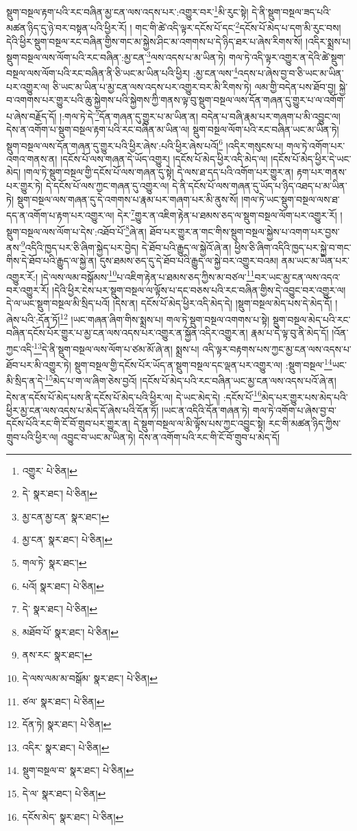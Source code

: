 སྡུག་བསྔལ་རྟག་པའི་རང་བཞིན་མྱ་ངན་ལས་འདས་པར་:འགྱུར་བར་\footnote{འགྱུར་  པེ་ཅིན། }མི་རུང་སྟེ། དེ་ནི་སྡུག་བསྔལ་ཟད་པའི་མཚན་ཉིད་དུ་ཉེ་བར་བསྟན་པའི་ཕྱིར་རོ། །
གང་གི་ཚེ་འདི་ལྟར་དངོས་པོ་དང་\footnote{དེ་  སྣར་ཐང་།  པེ་ཅིན། }དངོས་པོ་མེད་པ་དག་མི་རུང་བས། དེའི་ཕྱིར་སྡུག་བསྔལ་རང་བཞིན་གྱིས་གང་མ་སྐྱེས་ཤིང་མ་འགགས་པ་དེ་ཉིད་ཐར་པ་ཞེས་རིགས་སོ། །འདིར་སྨྲས་པ། སྡུག་བསྔལ་ལས་ལོག་པའི་རང་བཞིན་:མྱ་ངན་\footnote{མྱ་ངན་མྱ་ངན་  སྣར་ཐང་། }ལས་འདས་པ་མ་ཡིན་ཏེ། གལ་ཏེ་འདི་ལྟར་འགྱུར་ན་དེའི་ཚེ་སྡུག་བསྔལ་ལས་ལོག་པའི་རང་བཞིན་ནི་ཅི་ཡང་མ་ཡིན་པའི་ཕྱིར། :མྱ་ངན་ལས་\footnote{མྱ་ངན་  སྣར་ཐང་།  པེ་ཅིན། }འདས་པ་ཞེས་བྱ་བ་ཅི་ཡང་མ་ཡིན་པར་འགྱུར་ལ། ཅི་ཡང་མ་ཡིན་པ་མྱ་ངན་ལས་འདས་པར་འགྱུར་བར་མི་རིགས་ཏེ། ལམ་གྱི་བདེན་པས་ཐོབ་བྱ། སྐྱེ་བ་འགགས་པར་གྱུར་པའི་ཆུ་སྐྱེགས་པའི་སྐྱེགས་ཀྱི་གནས་ལྟ་བུ་སྡུག་བསྔལ་ལས་དོན་གཞན་དུ་གྱུར་པ་ལ་འགོག་པ་ཞེས་བརྗོད་དོ། །:གལ་ཏེ་དེ་\footnote{གལ་ཏེ་  སྣར་ཐང་། }དོན་གཞན་དུ་གྱུར་པ་མ་ཡིན་ན། བདེན་པ་བཞི་རྣམ་པར་གཞག་པ་མི་འབྱུང་ལ། དེས་ན་འགོག་པ་སྡུག་བསྔལ་རྟག་པའི་རང་བཞིན་མ་ཡིན་ལ། སྡུག་བསྔལ་ལོག་པའི་རང་བཞིན་ཡང་མ་ཡིན་ཏེ། སྡུག་བསྔལ་ལས་དོན་གཞན་དུ་གྱུར་པའི་ཕྱིར་ཞེས་:པའི་ཕྱིར་ཞེས་པའོ།\footnote{པའོ།  སྣར་ཐང་།  པེ་ཅིན། } །འདིར་གསུངས་པ། གལ་ཏེ་འགོག་པར་འགའ་གནས་ན། །དངོས་པོ་ལས་གཞན་དེ་ཡོད་འགྱུར། །དངོས་པོ་མེད་ཕྱིར་འདི་མེད་ལ། །དངོས་པོ་མེད་ཕྱིར་དེ་ཡང་མེད། །གལ་ཏེ་སྡུག་བསྔལ་གྱི་དངོས་པོ་ལས་གཞན་དུ་སྟེ། དེ་ལས་ཐ་དད་པའི་འགོག་པར་གྱུར་ན། རྟག་པར་གནས་པར་གྱུར་ཏེ། དེ་དངོས་པོ་ལས་ཀྱང་གཞན་དུ་འགྱུར་ལ། དེ་ནི་དངོས་པོ་ལས་གཞན་དུ་ཡོད་པ་ཉིད་འཐད་པ་མ་ཡིན་ཏེ། སྡུག་བསྔལ་ལས་གཞན་དུ་དེ་འགགས་པ་རྣམ་པར་གཞག་པར་མི་ནུས་སོ། །གལ་ཏེ་ཡང་སྡུག་བསྔལ་ལས་ཐ་དད་ན་འགོག་པ་རྟག་པར་འགྱུར་ལ། དེར་\footnote{དེ་  སྣར་ཐང་།  པེ་ཅིན། }གྱུར་ན་འཇིག་རྟེན་པ་ཐམས་ཅད་ལ་སྡུག་བསྔལ་ལོག་པར་འགྱུར་རོ། །སྡུག་བསྔལ་ལས་ལོག་པ་དེས་:འཐོབ་པོ་\footnote{མཐོབ་པོ་  སྣར་ཐང་།  པེ་ཅིན། }ཞེ་ན། ཐོབ་པར་གྱུར་ན་གང་གིས་སྡུག་བསྔལ་སྐྱེས་པ་འགག་པར་བྱས་ནས་\footnote{ནས་རང་  སྣར་ཐང་། }འདིའི་ཁྱད་པར་ཅི་ཞིག་སྐྱེད་པར་བྱེད། དེ་ཐོབ་པའི་རྒྱུད་ལ་སྐྱེའོ་ཞེ་ན། ཕྱིས་ཅི་ཞིག་འདིའི་ཁྱད་པར་སྐྱེ་བ་གང་གིས་དེ་ཐོབ་པའི་རྒྱུད་ལ་སྐྱེ་ན། དུས་ཐམས་ཅད་དུ་དེ་ཐོབ་པའི་རྒྱུད་ལ་སྐྱེ་བར་འགྱུར་བའམ། ནམ་ཡང་མ་ཡིན་པར་འགྱུར་རོ:། །དེ་ལས་ལམ་བསྒོམས་\footnote{དེ་ལས་ལམ་མ་བསྒོམ་  སྣར་ཐང་།  པེ་ཅིན། }པ་འཇིག་རྟེན་པ་ཐམས་ཅད་ཀྱིས་མ་བཙལ་\footnote{ཙལ་  སྣར་ཐང་།  པེ་ཅིན། }བར་ཡང་མྱ་ངན་ལས་འདའ་བར་འགྱུར་རོ། །དེའི་ཕྱིར་ངེས་པར་སྡུག་བསྔལ་ལ་ལྟོས་པ་དང་བཅས་པའི་རང་བཞིན་གྱིས་དེ་འབྱུང་བར་འགྱུར་ལ། དེ་ལ་ཡང་སྡུག་བསྔལ་མི་སྲིད་པའོ། །དེས་ན། དངོས་པོ་མེད་ཕྱིར་འདི་མེད་དེ། །སྡུག་བསྔལ་མེད་པས་དེ་མེད་དོ། །ཞེས་པའི་:དོན་ཏོ།\footnote{དོན་ཏེ།  སྣར་ཐང་།  པེ་ཅིན། } །ཡང་གཞན་ཞིག་གིས་སྨྲས་པ། གལ་ཏེ་སྡུག་བསྔལ་འགགས་པ་སྟེ། སྡུག་བསྔལ་མེད་པའི་རང་བཞིན་དངོས་པོར་གྱུར་པ་མྱ་ངན་ལས་འདས་པར་འགྱུར་ན་སྐྱོན་འདིར་འགྱུར་ན། རྣམ་པ་དེ་ལྟ་བུ་ནི་མེད་དོ། །འོན་ཀྱང་འདི་\footnote{འདིར་  སྣར་ཐང་།  པེ་ཅིན། }དེ་ནི་སྡུག་བསྔལ་ལས་ལོག་པ་ཙམ་མོ་ཞེ་ན། སྨྲས་པ། འདི་ལྟར་བརྟགས་པས་ཀྱང་མྱ་ངན་ལས་འདས་པ་ཐོབ་པར་མི་འགྱུར་ཏེ། སྡུག་བསྔལ་གྱི་དངོས་པོར་ཡོད་ན་སྡུག་བསྔལ་དང་ལྡན་པར་འགྱུར་ལ། :སྡུག་བསྔལ་\footnote{སྡུག་བསྔལ་བ་  སྣར་ཐང་།  པེ་ཅིན། }ཡང་མི་སྲིད་ན་དེ་\footnote{དེ་ལ་  སྣར་ཐང་།  པེ་ཅིན། }མེད་པ་ག་ལ་ཞིག་ཅེས་བྱའོ། །དངོས་པོ་མེད་པའི་རང་བཞིན་ཡང་མྱ་ངན་ལས་འདས་པའོ་ཞེ་ན། དེས་ན་དངོས་པོ་མེད་པས་ནི་དངོས་པོ་མེད་པའི་ཕྱིར་ལ། དེ་ཡང་མེད་དེ། :དངོས་པོ་\footnote{དངོས་མེད་  སྣར་ཐང་།  པེ་ཅིན། }མེད་པར་གྱུར་པས་མེད་པའི་ཕྱིར་མྱ་ངན་ལས་འདས་པ་མེད་དོ་ཞེས་པའི་དོན་ཏོ། །ཡང་ན་འདིའི་དོན་གཞན་ཏེ། གལ་ཏེ་འགོག་པ་ཞེས་བྱ་བ་དངོས་པོའི་རང་གི་ངོ་བོ་གྲུབ་པར་གྱུར་ན། དེ་སྡུག་བསྔལ་ལ་མི་ལྟོས་པས་ཀྱང་འབྱུང་སྟེ། རང་གི་མཚན་ཉིད་ཀྱིས་གྲུབ་པའི་ཕྱིར་ལ། འབྱུང་བ་ཡང་མ་ཡིན་ཏེ། དེས་ན་འགོག་པའི་རང་གི་ངོ་བོ་གྲུབ་པ་མེད་དོ། 